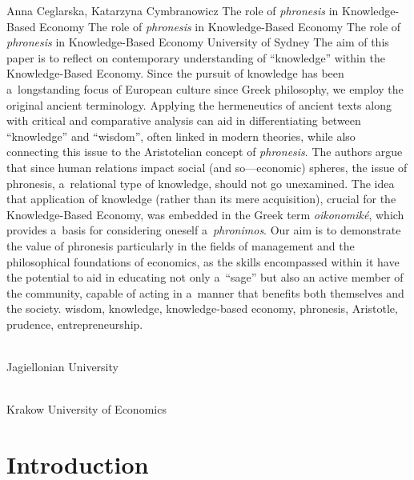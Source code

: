 \begin{artengenv2auth}{Anna Ceglarska, Katarzyna Cymbranowicz}
	{The role of \textit{phronesis} in Knowledge-Based Economy}
		{The role of \textit{phronesis} in Knowledge-Based Economy}
		{The role of \textit{phronesis} in Knowledge-Based Economy}
	{University of Sydney}
	{The aim of this paper is to reflect on contemporary understanding of ``knowledge'' within the Knowledge-Based Economy. Since the pursuit of knowledge has been a~longstanding focus of European culture since Greek philosophy, we employ the original ancient terminology. Applying the hermeneutics of ancient texts along with critical and comparative analysis can aid in differentiating between ``knowledge'' and ``wisdom'', often linked in modern theories, while also connecting this issue to the Aristotelian concept of \textit{phronesis}. The authors argue that since human relations impact social (and so---economic) spheres, the issue of phronesis, a~relational type of knowledge, should not go unexamined. The idea that application of knowledge (rather than its mere acquisition), crucial for the Knowledge-Based Economy, was embedded in the Greek term \textit{oikonomiké}, which provides a~basis for considering oneself a~\textit{phronimos}. Our aim is to demonstrate the value of phronesis particularly in the fields of management and the philosophical foundations of economics, as the skills encompassed within it have the potential to aid in educating not only a~``sage'' but also an active member of the community, capable of acting in a~manner that benefits both themselves and the society.
		}
		{wisdom, knowledge, knowledge-based economy, phronesis, Aristotle, prudence, entrepreneurship.}
	{%
		{\flushright{}\\\subsubsectit\small{Jagiellonian University}\label{ceglarska-firstpage}\par}%
		{\flushright{}\\\subsubsectit\small{Krakow University of Economics}\par}%
	}




\section{Introduction}


\end{artengenv2auth}
